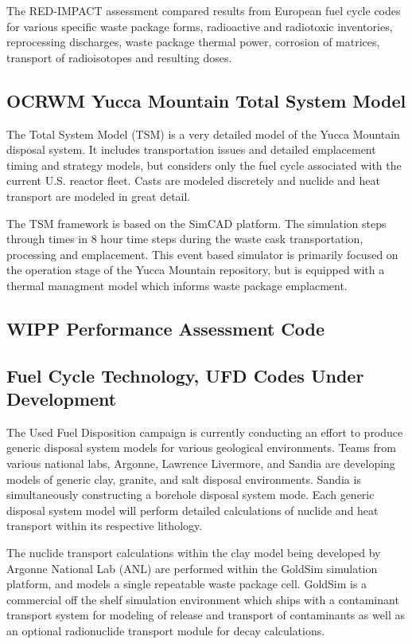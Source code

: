 The RED-IMPACT assessment compared results from European fuel cycle 
codes for various specific waste package forms, radioactive and 
radiotoxic inventories, reprocessing discharges,  waste package 
thermal power, corrosion of matrices, transport of radioisotopes and 
resulting doses.


\subsection{OCRWM Yucca Mountain Total System Model}
The Total System Model (TSM) is a very detailed model of the Yucca 
Mountain disposal system. It includes transportation issues and 
detailed emplacement timing and strategy models, but considers only 
the fuel cycle associated with the current  U.S. reactor fleet. Casts 
are modeled discretely and nuclide and heat transport are modeled in 
great detail.\cite{turner_discrete_2010} 

The TSM framework is based on the SimCAD platform. The simulation 
steps through times in 8 hour time steps during the waste cask 
transportation, processing and emplacement. This event based simulator 
is primarily focused on the operation stage of the Yucca Mountain 
repository, but is equipped with a thermal managment model which 
informs waste package emplacment.

\subsection{WIPP Performance Assessment Code}

\subsection{Fuel Cycle Technology, UFD Codes Under Development}

The Used Fuel Disposition campaign is currently conducting an effort 
to produce generic disposal system models for various geological 
environments. Teams from various national labs, Argonne, Lawrence 
Livermore, and Sandia are developing models of generic clay, granite,   
and salt disposal environments. Sandia is simultaneously constructing  
a borehole disposal system mode. Each generic disposal system model 
will perform detailed calculations of nuclide  and heat transport 
within its respective lithology. 

The nuclide transport calculations within the  clay model being 
developed by Argonne National Lab (ANL) are performed within the 
GoldSim simulation platform, and models a single repeatable waste 
package cell. GoldSim is a commercial off the shelf simulation 
environment which ships with a contaminant transport system for 
modeling of release and transport of contaminants as well as an 
optional radionuclide transport module for decay calculations.

